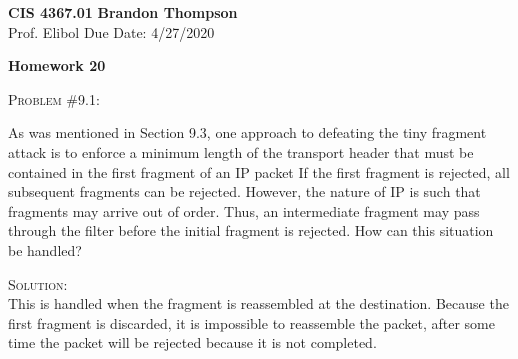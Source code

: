 \documentclass[12pt]{article}
\newenvironment{problem}[1]
{\begin{mdframed}[linewidth=0.8pt]
        \textsc{Problem #1:}

}
    {\end{mdframed}}
\newenvironment{solution}
    {\textsc{Solution:}\\}
    {\newpage}%
\begin{document}
\noindent
\textbf{CIS 4367.01} \hfill \textbf{Brandon Thompson} \\
\normalsize Prof. Elibol \hfill Due Date: 4/27/2020 \\

\begin{center}
\textbf{Homework 20}
\end{center}
	\begin{problem}{\#9.1}
		As was mentioned in Section 9.3, one approach to defeating the tiny fragment attack is to enforce a minimum length of the transport header that must be contained in the first fragment of an IP packet If the first fragment is rejected, all subsequent fragments can be rejected. However, the nature of IP is such that fragments may arrive out of order. Thus, an intermediate fragment may pass through the filter before the initial fragment is rejected. How can this situation be handled?
	\end{problem}
	\begin{solution}
		This is handled when the fragment is reassembled at the destination. Because the first fragment is discarded, it is impossible to reassemble the packet, after some time the packet will be rejected because it is not completed.
	\end{solution}
\end{document}
